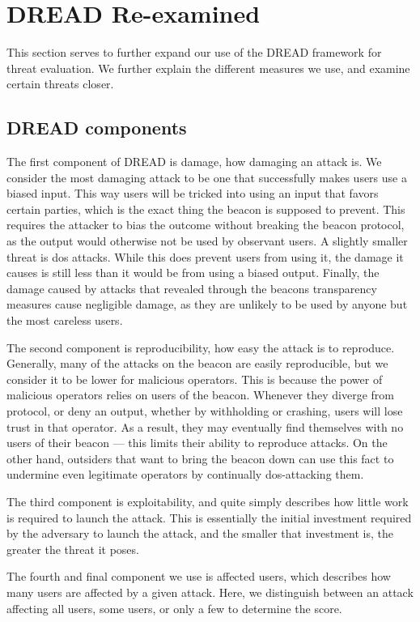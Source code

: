 \section{DREAD Re-examined}\label{app:dread}
This section serves to further expand our use of the DREAD framework for threat evaluation. We further explain the different measures we use, and examine certain threats closer.

\subsection{DREAD components}
The first component of DREAD is damage, how damaging an attack is. We consider the most damaging attack to be one that successfully makes users use a biased input. This way users will be tricked into using an input that favors certain parties, which is the exact thing the beacon is supposed to prevent. This requires the attacker to bias the outcome without breaking the beacon protocol, as the output would otherwise not be used by observant users.
A slightly smaller threat is \acrshort{dos} attacks. While this does prevent users from using it, the damage it causes is still less than it would be from using a biased output.
Finally, the damage caused by attacks that revealed through the beacons transparency measures cause negligible damage, as they are unlikely to be used by anyone but the most careless users.

The second component is reproducibility, how easy the attack is to reproduce. Generally, many of the attacks on the beacon are easily reproducible, but we consider it to be lower for malicious operators. This is because the power of malicious operators relies on users of the beacon. Whenever they diverge from protocol, or deny an output, whether by withholding or crashing, users will lose trust in that operator. As a result, they may eventually find themselves with no users of their beacon --- this limits their ability to reproduce attacks.
On the other hand, outsiders that want to bring the beacon down can use this fact to undermine even legitimate operators by continually \acrshort{dos}-attacking them.

The third component is exploitability, and quite simply describes how little work is required to launch the attack. This is essentially the initial investment required by the adversary to launch the attack, and the smaller that investment is, the greater the threat it poses.

The fourth and final component we use is affected users, which describes how many users are affected by a given attack. Here, we distinguish between an attack affecting all users, some users, or only a few to determine the score.

